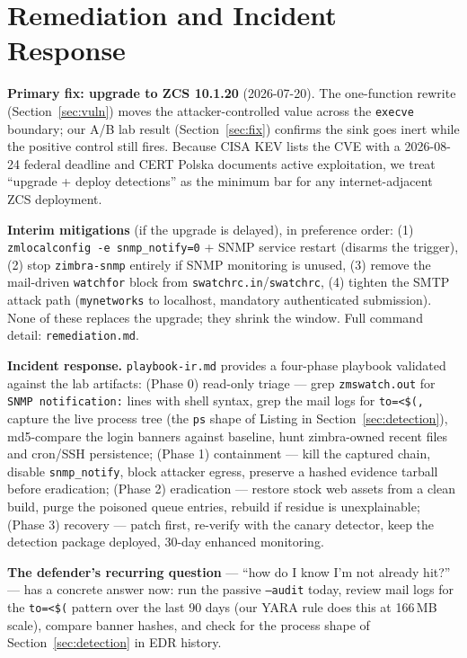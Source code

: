 
\section{Remediation and Incident Response}
\label{sec:remediation}

\textbf{Primary fix: upgrade to ZCS 10.1.20} (2026-07-20). The one-function
rewrite (Section~\ref{sec:vuln}) moves the attacker-controlled value across
the \texttt{execve} boundary; our A/B lab result
(Section~\ref{sec:fix}) confirms the sink goes inert while the positive
control still fires. Because CISA KEV lists the CVE with a 2026-08-24
federal deadline and CERT Polska documents active exploitation, we treat
``upgrade + deploy detections'' as the minimum bar for any internet-adjacent
ZCS deployment.

\textbf{Interim mitigations} (if the upgrade is delayed), in preference
order: (1) \texttt{zmlocalconfig -e snmp\_notify=0} + SNMP service restart
(disarms the trigger), (2) stop \texttt{zimbra-snmp} entirely if SNMP
monitoring is unused, (3) remove the mail-driven \texttt{watchfor} block from
\texttt{swatchrc.in}/\texttt{swatchrc}, (4) tighten the SMTP attack path
(\texttt{mynetworks} to localhost, mandatory authenticated submission).
None of these replaces the upgrade; they shrink the window. Full command
detail: \texttt{remediation.md}.

\textbf{Incident response.} \texttt{playbook-ir.md} provides a four-phase
playbook validated against the lab artifacts: (Phase 0) read-only triage —
grep \texttt{zmswatch.out} for \texttt{SNMP notification:} lines with shell
syntax, grep the mail logs for \texttt{to=<\$(,} capture the live process
tree (the \texttt{ps} shape of Listing in Section~\ref{sec:detection}),
md5-compare the login banners against baseline, hunt zimbra-owned recent
files and cron/SSH persistence; (Phase 1) containment — kill the captured
chain, disable \texttt{snmp\_notify}, block attacker egress, preserve a
hashed evidence tarball before eradication; (Phase 2) eradication — restore
stock web assets from a clean build, purge the poisoned queue entries,
rebuild if residue is unexplainable; (Phase 3) recovery — patch first,
re-verify with the canary detector, keep the detection package deployed,
30-day enhanced monitoring.

\textbf{The defender's recurring question} — ``how do I know I'm not
already hit?'' — has a concrete answer now: run the passive
\texttt{--audit} today, review mail logs for the \texttt{to=<\$(} pattern
over the last 90 days (our YARA rule does this at 166\,MB scale), compare
banner hashes, and check for the process shape of
Section~\ref{sec:detection} in EDR history.

